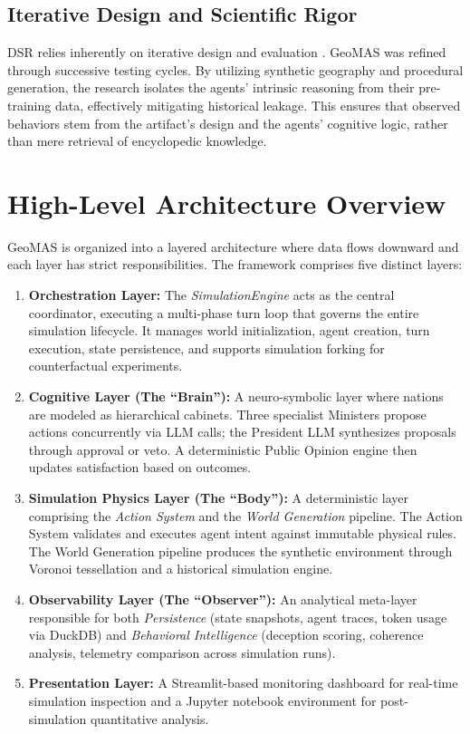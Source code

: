 \subsection{Iterative Design and Scientific Rigor}
DSR relies inherently on iterative design and evaluation \cite{hevner2004design}. GeoMAS was refined through successive testing cycles. By utilizing synthetic geography and procedural generation, the research isolates the agents' intrinsic reasoning from their pre-training data, effectively mitigating historical leakage. This ensures that observed behaviors stem from the artifact's design and the agents' cognitive logic, rather than mere retrieval of encyclopedic knowledge.



\section{High-Level Architecture Overview}
\label{sec:architecture_overview}
GeoMAS is organized into a layered architecture where data flows downward and each layer has strict responsibilities. The framework comprises five distinct layers:

\begin{enumerate}
    \item \textbf{Orchestration Layer:} The \textit{SimulationEngine} acts as the central coordinator, executing a multi-phase turn loop that governs the entire simulation lifecycle. It manages world initialization, agent creation, turn execution, state persistence, and supports simulation forking for counterfactual experiments.
    \item \textbf{Cognitive Layer (The ``Brain''):} A neuro-symbolic layer where nations are modeled as hierarchical cabinets. Three specialist Ministers propose actions concurrently via LLM calls; the President LLM synthesizes proposals through approval or veto. A deterministic Public Opinion engine then updates satisfaction based on outcomes.
    \item \textbf{Simulation Physics Layer (The ``Body''):} A deterministic layer comprising the \textit{Action System} and the \textit{World Generation} pipeline. The Action System validates and executes agent intent against immutable physical rules. The World Generation pipeline produces the synthetic environment through Voronoi tessellation and a historical simulation engine.
    \item \textbf{Observability Layer (The ``Observer''):} An analytical meta-layer responsible for both \textit{Persistence} (state snapshots, agent traces, token usage via DuckDB) and \textit{Behavioral Intelligence} (deception scoring, coherence analysis, telemetry comparison across simulation runs).
    \item \textbf{Presentation Layer:} A Streamlit-based monitoring dashboard for real-time simulation inspection and a Jupyter notebook environment for post-simulation quantitative analysis.
\end{enumerate}

